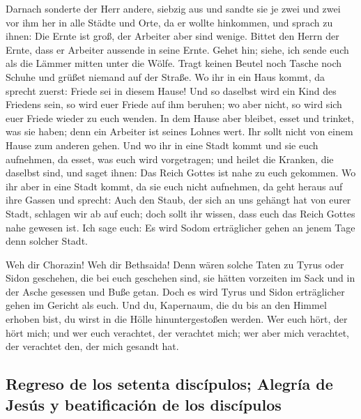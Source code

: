  Darnach sonderte der Herr andere, siebzig aus und sandte
sie je zwei und zwei vor ihm her in alle Städte und Orte, da er wollte
hinkommen,  und sprach zu ihnen: Die Ernte ist groß, der
Arbeiter aber sind wenige. Bittet den Herrn der Ernte, dass er Arbeiter
aussende in seine Ernte.  Gehet hin; siehe, ich sende euch
als die Lämmer mitten unter die Wölfe.  Tragt keinen
Beutel noch Tasche noch Schuhe und grüßet niemand auf der Straße.
 Wo ihr in ein Haus kommt, da sprecht zuerst: Friede sei
in diesem Hause!  Und so daselbst wird ein Kind des
Friedens sein, so wird euer Friede auf ihm beruhen; wo aber nicht, so
wird sich euer Friede wieder zu euch wenden.  In dem Hause
aber bleibet, esset und trinket, was sie haben; denn ein Arbeiter ist
seines Lohnes wert. Ihr sollt nicht von einem Hause zum anderen gehen.
 Und wo ihr in eine Stadt kommt und sie euch aufnehmen, da
esset, was euch wird vorgetragen;  und heilet die Kranken,
die daselbst sind, und saget ihnen: Das Reich Gottes ist nahe zu euch
gekommen.  Wo ihr aber in eine Stadt kommt, da sie euch
nicht aufnehmen, da geht heraus auf ihre Gassen und sprecht:
 Auch den Staub, der sich an uns gehängt hat von eurer
Stadt, schlagen wir ab auf euch; doch sollt ihr wissen, dass euch das
Reich Gottes nahe gewesen ist.  Ich sage euch: Es wird
Sodom erträglicher gehen an jenem Tage denn solcher Stadt.

 Weh dir Chorazin! Weh dir Bethsaida! Denn wären solche
Taten zu Tyrus oder Sidon geschehen, die bei euch geschehen sind, sie
hätten vorzeiten im Sack und in der Asche gesessen und Buße getan.
 Doch es wird Tyrus und Sidon erträglicher gehen im
Gericht als euch.  Und du, Kapernaum, die du bis an den
Himmel erhoben bist, du wirst in die Hölle hinuntergestoßen werden.
 Wer euch hört, der hört mich; und wer euch verachtet,
der verachtet mich; wer aber mich verachtet, der verachtet den, der mich
gesandt hat.

\hypertarget{regreso-de-los-setenta-discuxedpulos-alegruxeda-de-jesuxfas-y-beatificaciuxf3n-de-los-discuxedpulos}{%
\subsection{Regreso de los setenta discípulos; Alegría de Jesús y
beatificación de los
discípulos}\label{regreso-de-los-setenta-discuxedpulos-alegruxeda-de-jesuxfas-y-beatificaciuxf3n-de-los-discuxedpulos}}

